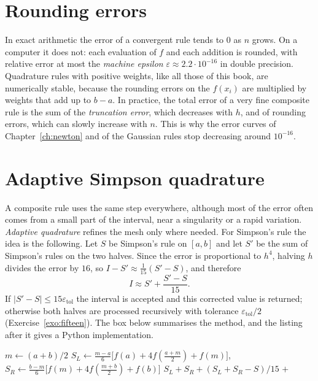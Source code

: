 \documentclass[11pt,a4paper,twoside,openright]{book}
\newcommand{\abs}[1]{\lvert #1\rvert}
\newcounter{exo}[chapter]
\begin{document}
\section{Rounding errors}
In exact arithmetic the error of a convergent rule tends to $0$ as $n$ grows. On a computer it does not: each evaluation of $f$ and each addition is rounded, with relative error at most the \emph{machine epsilon} $\varepsilon\approx2.2\cdot10^{-16}$ in double precision.
Quadrature rules with positive weights, like all those of this book, are numerically stable, because the rounding errors on the $f(x_i)$ are multiplied by weights that add up to $b-a$.
In practice, the total error of a very fine composite rule is the sum of the \emph{truncation error}, which decreases with $h$, and of rounding errors, which can slowly increase with $n$.
This is why the error curves of Chapter~\ref{ch:newton} and of the Gaussian rules stop decreasing around $10^{-16}$.

\section{Adaptive Simpson quadrature}
A composite rule uses the same step everywhere, although most of the error often comes from a small part of the interval, near a singularity or a rapid variation.
\emph{Adaptive quadrature} refines the mesh only where needed.
For Simpson's rule the idea is the following.
Let $S$ be Simpson's rule on $[a,b]$ and let $S'$ be the sum of Simpson's rules on the two halves.
Since the error is proportional to $h^{4}$, halving $h$ divides the error by $16$, so $I-S'\approx\frac{1}{15}(S'-S)$, and therefore
\[
  I\approx S'+\frac{S'-S}{15}.
\]
If $\abs{S'-S}\le15\varepsilon_{\mathrm{tol}}$ the interval is accepted and this corrected value is returned; otherwise both halves are processed recursively with tolerance $\varepsilon_{\mathrm{tol}}/2$ (Exercise~\ref{exo:fifteen}).
The box below summarises the method, and the listing after it gives a Python implementation.

\begin{tcolorbox}[enhanced,breakable,colback=white,colframe=navy!40,boxrule=0.5pt,arc=2pt,title={\bfseries Algorithm: adaptive Simpson quadrature},coltitle=white,colbacktitle=navy,fonttitle=\small]
\small
\begin{algorithmic}[1]
    \State $m\gets(a+b)/2$
    \State $S_L\gets\frac{m-a}{6}\bigl[f(a)+4f(\tfrac{a+m}{2})+f(m)\bigr]$,\quad $S_R\gets\frac{b-m}{6}\bigl[f(m)+4f(\tfrac{m+b}{2})+f(b)\bigr]$
    \If{$\abs{S_L+S_R-S}\le15\varepsilon$}
      \State \Return $S_L+S_R+(S_L+S_R-S)/15$
    \Else
      \State \Return {} $+$ 
    \EndIf
  \EndFunction
\end{algorithmic}
\end{tcolorbox}
\end{document}
